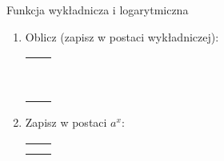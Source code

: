 \documentclass[12pt,a4paper]{article}
\begin{document}
	\begin{center}
		\LARGE Funkcja wykładnicza i logarytmiczna
	\end{center}
	\vspace{1.5cm}
	
	\begin{enumerate}[1.]
		
		\item Oblicz (zapisz w postaci wykładniczej):
		
		\begin{enumerate}[a)] \begin{tabular}{p{7cm} p{7cm}}
				\item $6^5\cdot6^{-3}:6^7=$& \vspace{0.4cm}\item $2^{10}\cdot2^{-7}:2^{-3}=$ \\
				\large\item $\frac{5^{21}:5^6}{5^{10}}=$& \item$\frac{8^5}{4^7}=$ \\\normalfont
				\item $32\cdot16^2\cdot8^3=$& \item$25\cdot5^2\cdot125^3=$ \\
				\item $8\cdot16^3\cdot32^2=$& \item$6^{10}\cdot36^{-3}:6^5=$ \\
				\item $(-4)^6\cdot4^3\cdot(-4)^{-2}=$& \item$\frac{13^{12}}{(-13)^{-12}}=$ \\
				\large\item $\frac{(2^7)^4}{2^{30}:2^{14}}=$& \item$32^6:2^{18}=$ \\
				\item $\frac{44^4}{22^3}=$& \item$\frac{81\cdot25}{15^2}=$ \\
				\item $\frac{8^3\cdot6^3}{27\cdot4^5}=$& \item$\frac{50\cdot8^2}{250\cdot2^2}=$ \\\normalfont

		\end{tabular} \end{enumerate}
	
	\item Zapisz w postaci $a^x$:
	
			\begin{enumerate}[a)] \begin{tabular}{p{7cm} p{7cm}} \large
			\item $\frac{(a^5)^3\cdot a^7}{a^3:(a^{-4})^{-2}}=$& \vspace{0.4cm}\item $\frac{(a^3)^4:a}{a^{-9}:a^3}=$ \\ \normalfont
			\item $(a^7:(a^3)^{-2})^{-1}\cdot(a^{-7}\cdot a^5)^2=$& \item$(\frac{1}{a}^5\cdot a^7):(\frac{1}{a^2}^{-3}:a^4)=$ \\
	\end{tabular} \end{enumerate}


\end{enumerate}
\end{document}
